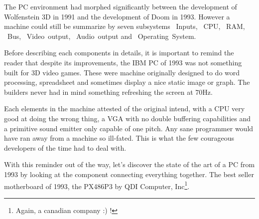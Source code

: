 The PC environment had morphed significantly between the development of Wolfenstein 3D in 1991 and the development of Doom in 1993. However a machine could still be summarize by seven subsystems ~Inputs, ~CPU, ~RAM, ~Bus, ~Video~output, ~Audio~output and ~Operating~System.\\
\par
{}
\par
Before describing each components in details, it is important to remind the reader that despite its improvements, the IBM PC of 1993 was not something built for 3D video games. These were machine originally designed to do word processing, spreadsheet and sometimes display a nice static image or graph. The builders never had in mind something refreshing the screen at 70Hz.\\
\par Each elements in the machine attested of the original intend, with a CPU very good at doing the wrong thing, a VGA with no double buffering capabilities and a primitive sound emitter only capable of one pitch. Any sane programmer would have ran away from a machine so ill-fated. This is what the few courageous developers of the time had to deal with.\\
\par
With this reminder out of the way, let's discover the state of the art of a PC from 1993 by looking at the component connecting everything together. The best seller motherboard of 1993, the PX486P3 by QDI Computer, Inc\footnote{Again, a canadian company :) !}.\\
\par

